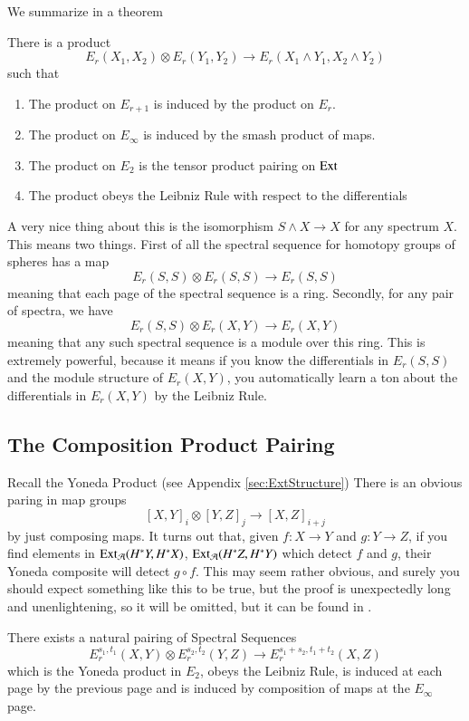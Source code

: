 We summarize in a theorem
\begin{Theorem}
  \label{sec:product}
  There is a product
  \[E_r(X_1,X_2)\otimes E_r(Y_1,Y_2)\to E_r(X_1\wedge Y_1,X_2\wedge Y_2)\]
  such that
  \begin{enumerate}
    \item The product on $E_{r+1}$ is induced by the product on $E_r$.
    \item The product on $E_\infty$ is induced by the smash product of maps.
    \item The product on $E_2$ is the tensor product pairing on $\operatorname{Ext}\nolimits$
    \item The product obeys the Leibniz Rule with respect to the differentials
  \end{enumerate}
\end{Theorem}


A very nice thing about this is the isomorphism $S\wedge X\to X$ for any spectrum $X$.
This means two things.
First of all the spectral sequence for homotopy groups of spheres has a map
\[E_r(S,S)\otimes E_r(S,S)\to E_r(S,S)\]
meaning that each page of the spectral sequence is a ring.
Secondly, for any pair of spectra, we have
\[E_r(S,S)\otimes E_r(X,Y)\to E_r(X,Y)\]
meaning that any such spectral sequence is a module over this ring.
This is extremely powerful, because it means if you know the differentials in $E_r(S,S)$ and the module structure of $E_r(X,Y)$, you automatically learn a ton about the differentials in $E_r(X,Y)$ by the Leibniz Rule.  


\subsection{The Composition Product Pairing}
\label{sec:pairing}
Recall the Yoneda Product (see Appendix \ref{sec:ExtStructure})
There is an obvious paring in map groups
\[[X,Y]_i\otimes [Y,Z]_j \to [X,Z]_{i+j}\]
by just composing maps.  
It turns out that, given $f:X\to Y$ and $g:Y\to Z$, if you find elements in $\operatorname{Ext}\nolimits_{\mathcal{A}}(H^*Y,H^*X)$, $\operatorname{Ext}\nolimits_{\mathcal{A}}(H^*Z,H^*Y)$ which detect $f$ and $g$, their Yoneda composite will detect $g\circ f$.  
This may seem rather obvious, and surely you should expect something like this to be true, but the proof is unexpectedly long and unenlightening, so it will be omitted, but it can be found in \cite{mossProduct}.  
\begin{Theorem}
  There exists a natural pairing of Spectral Sequences
  \[E^{s_1,t_1}_r(X,Y)\otimes E_r^{s_2,t_2}(Y,Z)\to E^{s_1+s_2,t_1+t_2}_r(X,Z)\]
  which is the Yoneda product in $E_2$, obeys the Leibniz Rule, is induced at each page by the previous page and is induced by composition of maps at the $E_\infty$ page.  
\end{Theorem}

